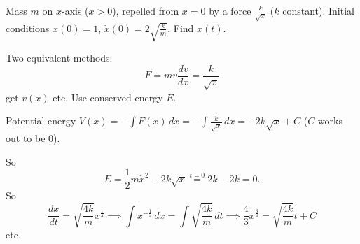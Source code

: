 \documentclass[10pt, a4paper]{article}
\begin{document}
\begin{problem}
    Mass $m$ on $x$-axis
    ($x > 0$),
    repelled from $x = 0$ by a force $\frac{k}{\sqrt{x}}$
    ($k$ constant).
    Initial conditions $x(0) = 1$,
    $\dot{x}(0) = 2\sqrt{\frac{k}{m}}$.
    Find $x(t)$.

    \begin{solution}
        Two equivalent methods:
        \[
        F = mv\frac{dv}{dx} = \frac{k}{\sqrt{x}}
        \]
        get $v(x)$ etc.
        Use conserved energy $E$.

        Potential energy $V(x) = -\int F(x)\,dx = -\int\frac{k}{\sqrt{x}}\,dx = -2k\sqrt{x}+ C$
        ($C$ works out to be $0$).

        So
        \[
        E = \frac{1}{2}m\dot{x} ^ 2 - 2k\sqrt{x} \overset{t = 0}{=} 2k - 2k = 0.
        \]
        So
        \[
        \frac{dx}{dt} = \sqrt{\frac{4k}{m}}x ^ {\frac{1}{4}} \implies \int x ^ {-\frac{1}{4}}\,dx = \int\sqrt{\frac{4k}{m}}\,dt \implies \frac{4}{3}x ^ {\frac{3}{4}} = \sqrt{\frac{4k}{m}}t + C
        \]
        etc.
    \end{solution}
\end{problem}
\end{document}
